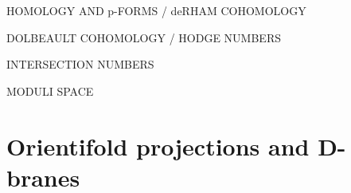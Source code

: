 %
%
%
%
%
%


HOMOLOGY AND p-FORMS / deRHAM COHOMOLOGY

DOLBEAULT COHOMOLOGY / HODGE NUMBERS

INTERSECTION NUMBERS


MODULI SPACE
%
%
%
%

\section{Orientifold projections and D-branes}
